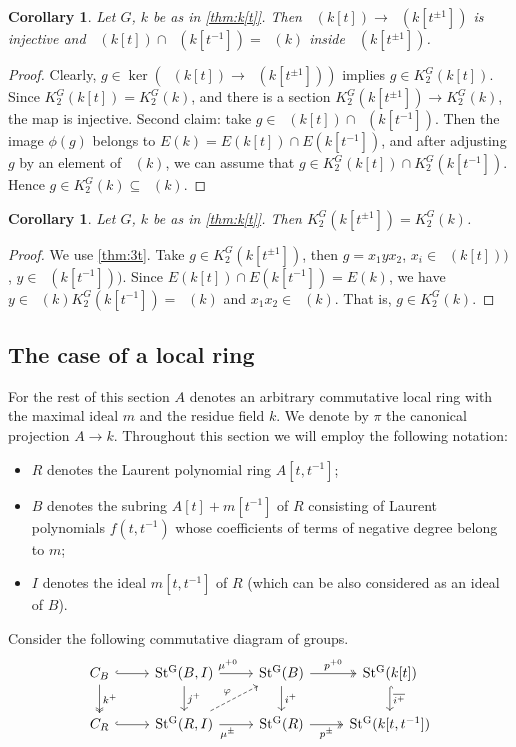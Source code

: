 \documentclass[oneside,12pt]{amsart}
\numberwithin{equation}{section}
\numberwithin{lem}{section}
\newtheorem{cor}[lem]{Corollary}
\theoremstyle{definition}
\theoremstyle{remark}
\DeclareMathOperator{\St}{St^G}
\begin{document}
\begin{cor}\label{cor:k[t]inj}
Let $G$, $k$ be as in \cref{thm:k[t]}. 
Then $\St(k[t])\to\St(k[t^{\pm 1}])$ is injective and $\St(k[t])\cap\St(k[t^{-1}])=\St(k)$ inside $\St(k[t^{\pm 1}])$.
\end{cor}
\begin{proof}
Clearly, $g\in\ker(\St(k[t])\to\St(k[t^{\pm 1}]))$ implies $g\in K_2^G(k[t])$. Since $K_2^G(k[t])=K_2^G(k)$,
and  there is a section $K_2^G(k[t^{\pm 1}])\to K_2^G(k)$, the map is injective.
Second claim: take $g\in \St(k[t])\cap\St(k[t^{-1}])$.
Then the image $\phi(g)$ belongs to $E(k)=E(k[t])\cap E(k[t^{-1}])$, and
after adjusting $g$ by an element of $\St(k)$, we can assume that $g\in K_2^G(k[t])\cap K_2^G(k[t^{-1}])$. Hence
$g\in K_2^G(k)\subseteq\St(k)$.
\end{proof}

\begin{cor}
Let $G$, $k$ be as in \cref{thm:k[t]}. Then $K_2^G(k[t^{\pm 1}])=K_2^G(k)$.
\end{cor}
\begin{proof}
We use \cref{thm:3t}.
Take $g\in K_2^G(k[t^{\pm 1}])$,
then $g=x_1yx_2$, $x_i\in \St(k[t]))$, $y\in \St(k[t^{-1}]))$.
Since $E(k[t])\cap E(k[t^{-1}])=E(k)$,
we have $y\in\St(k)K_2^G(k[t^{-1}])=\St(k)$ and $x_1x_2\in\St(k)$. That is, $g\in K_2^G(k)$.
\end{proof}

\subsection{The case of a local ring}
For the rest of this section $A$ denotes an arbitrary commutative local ring with the maximal ideal $m$ and the residue field $k$.
We denote by $\pi$ the canonical projection $A \rightarrow k$.
Throughout this section we will employ the following notation:
\begin{itemize}
 \item $R$ denotes the Laurent polynomial ring $A[t, t^{-1}]$;
 \item $B$ denotes the subring $A[t] + m[t^{-1}]$ of $R$ consisting of Laurent polynomials $f(t,t^{-1})$ whose coefficients of terms of negative degree belong to $m$;
 \item $I$ denotes the ideal $m[t, t^{-1}]$ of $R$ (which can be also considered as an ideal of $B$). \end{itemize}

Consider the following commutative diagram of groups.
\begin{equation} \label{diag:cs} \begin{tikzcd} 
C_{B} \ar[r, hookrightarrow] \ar[d, "k^+", twoheadrightarrow] & \St(B, I) \ar[r, "\mu^{+0}" near start] \ar[d, "j^+"] & \ar[d, "i^+"] \St(B) \ar[r, "p^{+0}", twoheadrightarrow] & \St(k[t]) \ar[d, hookrightarrow, "\overline{i^+}"] \\     
C_{R} \ar[r, hookrightarrow]                                  & \St(R, I) \ar[ur, dashrightarrow, "\varphi"] \ar[r, "\mu^\pm"' near start] & \St(R) \ar[r, "p^\pm"', twoheadrightarrow] & \St(k[t, t^{-1}]) \\ \end{tikzcd} \end{equation}
\end{document}
